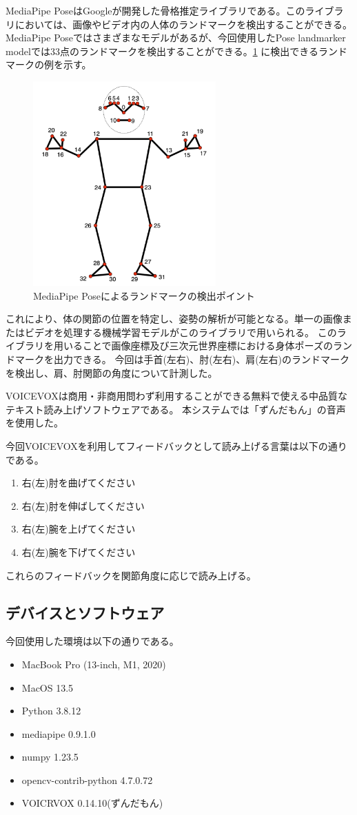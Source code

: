 MediaPipe Pose\cite{mediapipe_pose_landmarker}はGoogleが開発した骨格推定ライブラリである。このライブラリにおいては、画像やビデオ内の人体のランドマークを検出することができる。
MediaPipe Poseではさまざまなモデルがあるが、今回使用したPose landmarker modelでは33点のランドマークを検出することができる。\ref{fig:mediapipe} に検出できるランドマークの例を示す。
\begin{figure}[H]
  \begin{center}
    \includegraphics[width=7cm]{figures/mediapipe.png}
    \caption{MediaPipe Poseによるランドマークの検出ポイント \cite{mediapipe_pose_landmarker} }
    \label{fig:mediapipe}
  \end{center}
\end{figure}  
これにより、体の関節の位置を特定し、姿勢の解析が可能となる。単一の画像またはビデオを処理する機械学習モデルがこのライブラリで用いられる。
このライブラリを用いることで画像座標及び三次元世界座標における身体ポーズのランドマークを出力できる。
今回は手首(左右)、肘(左右)、肩(左右)のランドマークを検出し、肩、肘関節の角度について計測した。

VOICEVOXは商用・非商用問わず利用することができる無料で使える中品質なテキスト読み上げソフトウェアである。
本システムでは「ずんだもん」の音声を使用した。


今回VOICEVOXを利用してフィードバックとして読み上げる言葉は以下の通りである。
\begin{enumerate}
  \item 右(左)肘を曲げてください
  \item 右(左)肘を伸ばしてください
  \item 右(左)腕を上げてください
  \item 右(左)腕を下げてください
\end{enumerate}
これらのフィードバックを関節角度に応じで読み上げる。

\subsection{デバイスとソフトウェア}
今回使用した環境は以下の通りである。
\begin{itemize}
  \item MacBook Pro (13-inch, M1, 2020)
  \item MacOS 13.5
  \item Python 3.8.12
  \item mediapipe 0.9.1.0
  \item numpy 1.23.5
  \item opencv-contrib-python 4.7.0.72
  \item VOICRVOX 0.14.10(ずんだもん)
\end{itemize}

